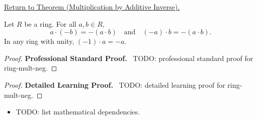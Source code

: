 \newpage
{}
\label{prf:ring-mult-neg}

\begin{remark*}[Return]
\hyperref[prop:ring-mult-neg]{Return to Theorem (Multiplication by Additive Inverse).}
\end{remark*}

\begin{theorem*}
Let $R$ be a ring. For all $a, b \in R$,
\[
a \cdot (-b) = -(a \cdot b)
\quad\text{and}\quad
(-a) \cdot b = -(a \cdot b).
\]
In any ring with unity, $(-1) \cdot a = -a$.
\end{theorem*}

\begin{proof}
\textbf{Professional Standard Proof.}~
TODO: professional standard proof for ring-mult-neg.
\end{proof}

\begin{proof}
\textbf{Detailed Learning Proof.}~
TODO: detailed learning proof for ring-mult-neg.
\end{proof}

\begin{remark*}
\end{remark*}

\begin{dependencies}
\begin{itemize}
  \item TODO: list mathematical dependencies.
\end{itemize}
\end{dependencies}

\clearpage
